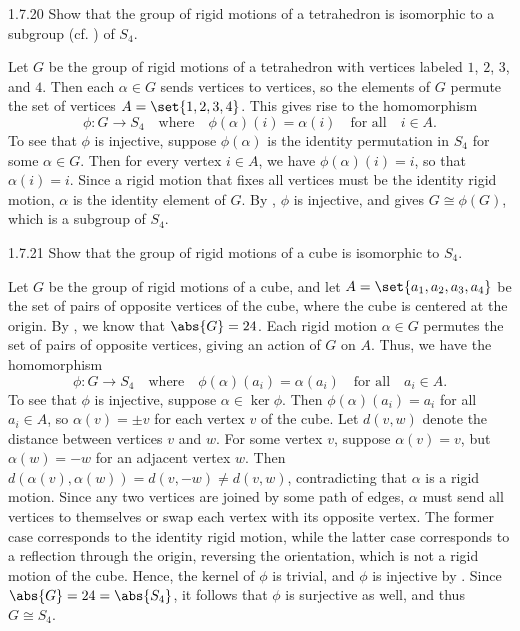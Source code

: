 \begin{exercise}{1.7.20}
    Show that the group of rigid motions of a tetrahedron is isomorphic to a subgroup (cf. ) of $S_4$.
\end{exercise}

\begin{sol}
    Let $G$ be the group of rigid motions of a tetrahedron with vertices labeled $1$, $2$, $3$, and $4$.
	Then each $\alpha \in G$ sends vertices to vertices, so the elements of $G$ permute the set of vertices $A = \set{1, 2, 3, 4}$.
    This gives rise to the homomorphism
    \[
    	\phi \colon G \to S_4 \quad \text{where} \quad \phi(\alpha)(i) = \alpha(i) \quad \text{for all} \quad i \in A.
    \]
    To see that $\phi$ is injective, suppose $\phi(\alpha)$ is the identity permutation in $S_4$ for some $\alpha \in G$.
	Then for every vertex $i \in A$, we have $\phi(\alpha)(i) = i$, so that $\alpha(i) = i$.
	Since a rigid motion that fixes all vertices must be the identity rigid motion, $\alpha$ is the identity element of $G$.
	By , $\phi$ is injective, and  gives $G \cong \phi(G)$, which is a subgroup of $S_4$.
\end{sol}

\begin{exercise}{1.7.21}
    Show that the group of rigid motions of a cube is isomorphic to $S_4$.
\end{exercise}

\begin{sol}
	Let $G$ be the group of rigid motions of a cube, and let $A = \set{a_1, a_2, a_3, a_4}$ be the set of pairs of opposite vertices of the cube, where the cube is centered at the origin.
    By , we know that $\abs{G} = 24$.
    Each rigid motion $\alpha \in G$ permutes the set of pairs of opposite vertices, giving an action of $G$ on $A$.
    Thus, we have the homomorphism
    \[
    	\phi \colon G \to S_4 \quad \text{where} \quad \phi(\alpha)(a_i) = \alpha(a_i) \quad \text{for all} \quad a_i \in A.
    \]
    To see that $\phi$ is injective, suppose $\alpha \in \ker\phi$.
    Then $\phi(\alpha)(a_i) = a_i$ for all $a_i \in A$, so $\alpha(v) = \pm v$ for each vertex $v$ of the cube.
    Let $d(v, w)$ denote the distance between vertices $v$ and $w$.
    For some vertex $v$, suppose $\alpha(v) = v$, but $\alpha(w) = -w$ for an adjacent vertex $w$.
    Then $d(\alpha(v), \alpha(w)) = d(v, -w) \neq d(v, w)$, contradicting that $\alpha$ is a rigid motion.
    Since any two vertices are joined by some path of edges, $\alpha$ must send all vertices to themselves or swap each vertex with its opposite vertex.
    The former case corresponds to the identity rigid motion, while the latter case corresponds to a reflection through the origin, reversing the orientation, which is not a rigid motion of the cube.
    Hence, the kernel of $\phi$ is trivial, and $\phi$ is injective by .
    Since $\abs{G} = 24 = \abs{S_4}$, it follows that $\phi$ is surjective as well, and thus $G \cong S_4$.
\end{sol}

